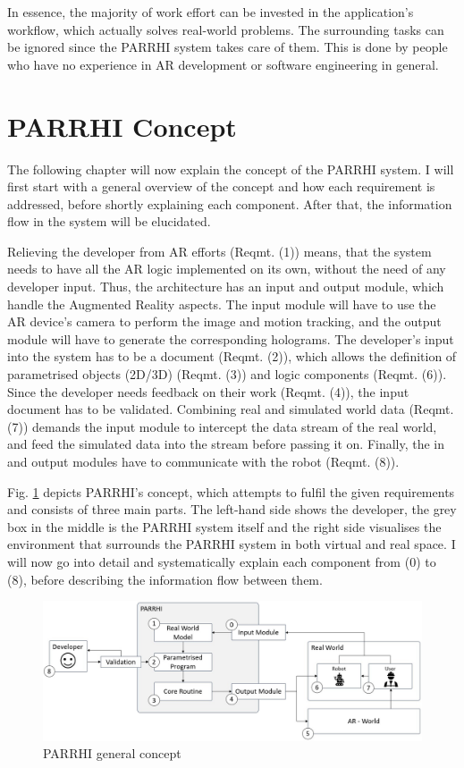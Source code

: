 In essence, the majority of work effort can be invested in the application's workflow, which actually solves real-world problems. The surrounding tasks can be ignored since the PARRHI system takes care of them. This is done by people who have no experience in AR development or software engineering in general.

\section{PARRHI Concept}

The following chapter will now explain the concept of the PARRHI system. I will first start with a general overview of the concept and how each requirement is addressed, before shortly explaining each component. After that, the information flow in the system will be elucidated.

Relieving the developer from AR efforts (Reqmt. (1)) means, that the system needs to have all the AR logic implemented on its own, without the need of any developer input. Thus, the architecture has an input and output module, which handle the Augmented Reality aspects. The input module will have to use the AR device's camera to perform the image and motion tracking, and the output module will have to generate the corresponding holograms. The developer's input into the system has to be a document (Reqmt. (2)), which allows the definition of parametrised objects (2D/3D) (Reqmt. (3)) and logic components (Reqmt. (6)). Since the developer needs feedback on their work (Reqmt. (4)), the input document has to be validated. Combining real and simulated world data (Reqmt. (7)) demands the input module to intercept the data stream of the real world, and feed the simulated data into the stream before passing it on. Finally, the in and output modules have to communicate with the robot (Reqmt. (8)).

Fig. \ref{Fig:PARRHIConcept} depicts PARRHI's concept, which attempts to fulfil the given requirements and consists of three main parts. The left-hand side shows the developer, the grey box in the middle is the PARRHI system itself and the right side visualises the environment that surrounds the PARRHI system in both virtual and real space. I will now go into detail and systematically explain each component from (0) to (8), before describing the information flow between them.

\begin{figure}[h]
	\centering
	\includegraphics[width=1\textwidth]{Figures/PARRHIConcept03.jpg}
	\caption{PARRHI general concept}
	\label{Fig:PARRHIConcept}
\end{figure}

